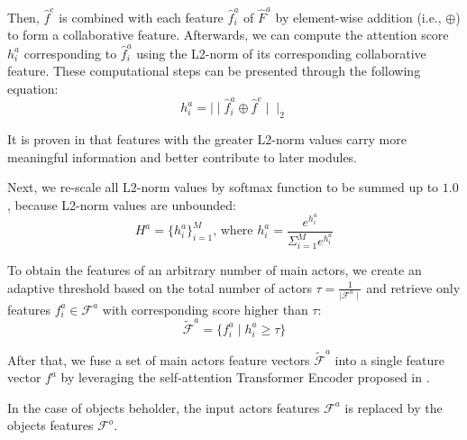 \documentclass[sn-mathphys]{sn-jnl}
\theoremstyle{thmstyleone}\newtheorem{theorem}{Theorem}\newtheorem{proposition}[theorem]{Proposition}
\theoremstyle{thmstyletwo}\newtheorem{example}{Example}\newtheorem{remark}{Remark}
\theoremstyle{thmstylethree}\newtheorem{definition}{Definition}
\begin{document}
Then, $\hat{f}^{e}$ is combined with each feature $\hat{f}_i^a$ of $\hat{F}^{a}$ by element-wise addition (i.e., $\oplus$) to form a collaborative feature. Afterwards, we can compute the attention score $h_i^a$ corresponding to $\hat{f}_i^a$ using the L2-norm of its corresponding collaborative feature. These computational steps can be presented through the following equation:
\begin{equation}
    h^a_i = \mid\mid \hat{f}^a_i \oplus \hat{f}^e \mid\mid_2
\end{equation}

It is proven in \cite{adahard_eccv2018} that features with the greater L2-norm values carry more meaningful information and better contribute to later modules. 



Next, we re-scale all L2-norm values by softmax function to be summed up to $1.0$, because L2-norm values are unbounded:
\begin{equation}
H^a = \{ h^a_i\}_{i=1}^{M} \text{, where } h^a_i = \frac{e^{h^a_i}}{\Sigma^{M}_{i=1}e^{h^a_i}}
\end{equation}

To obtain the features of an arbitrary number of main actors, we create an adaptive threshold based on the total number of actors $\tau = \frac{1}{\mid \mathcal{F}^a \mid}$ and retrieve only features $f^a_i \in \mathcal{F}^a$ with corresponding score higher than $\tau$:
\begin{equation}
\tilde{\mathcal{F}}^a = \{ f^a_i \mid h^a_i \geq \tau \}
\label{eq:act_select}
\end{equation}

After that, we fuse a set of main actors feature vectors $\tilde{\mathcal{F}}^a$ into a single feature vector $f^a$ by leveraging the self-attention Transformer Encoder proposed in \cite{attention_is_all_you_need}.


In the case of objects beholder, the input actors features $\mathcal{F}^a$ is replaced by the objects features $\mathcal{F}^o$.
\end{document}
